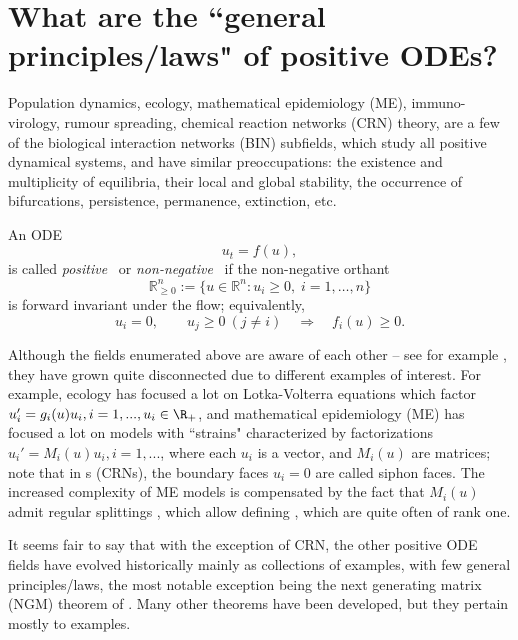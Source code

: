 
\section{What are the ``general principles/laws" of positive ODEs?}

Population dynamics,  ecology,  mathematical epidemiology (ME), immuno-virology, rumour spreading,  chemical reaction networks (CRN) theory, are a few of the biological
interaction networks (BIN) subfields, which study all positive dynamical systems, and have similar preoccupations: the existence and multiplicity of equilibria, their local and
global stability, the occurrence of bifurcations,   persistence, permanence, extinction, etc.

An ODE
\[
u_t=f(u),
\]
 is called \emph{positive}~\cite{rantzer2015scalable} or
\emph{non-negative}~\cite{haddad2010} if the non-negative orthant
\[
\mathbb{R}^n_{\ge 0} := \{ u \in \mathbb{R}^n : u_i \ge 0,\; i = 1,\dots,n \}
\]
is forward invariant under the flow; equivalently,
\[
u_i=0,\qquad u_j\ge0\ (j\ne i)
\quad\Longrightarrow\quad
f_i(u)\ge0 .
\]
\eeD






Although the  fields enumerated above are aware of each other  -- see  for  example \cite{AndKurtz}, they have grown quite disconnected due to different examples of interest.  For example, ecology has focused a lot on Lotka-Volterra equations
which factor $u_i'= g_i(u) u_i, i=1, ..., u_i \in \R_+$, and mathematical epidemiology (ME) has focused a lot on models with ``strains" characterized by  factorizations $u_i'= M_i(u) u_i, i=1, ...$, where each $u_i$ is a vector, and $M_i(u)$ are matrices; note that in \CRN s (CRNs), the boundary faces $u_i=0$ are called  siphon faces.
The increased complexity of ME models is compensated by the fact that $M_i(u)$ admit regular splittings \cite{Varga,Van}, which allow defining \NGMs, which are quite often of rank one.

It seems fair to say that with the exception of CRN, the other positive ODE fields have evolved historically mainly as collections of examples, with few general principles/laws, the most notable exception being the next generating matrix (NGM) theorem of \cNGM.
Many other theorems have been developed, but they pertain mostly to examples.

